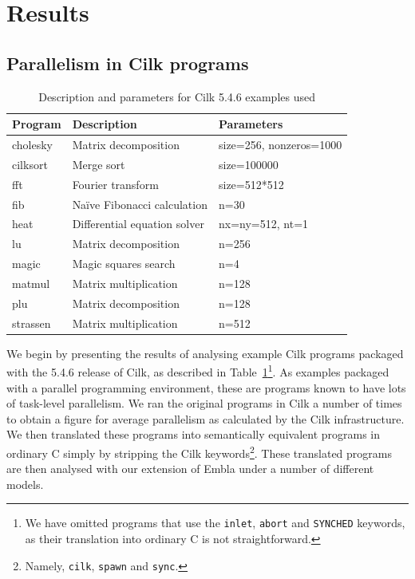 \section{Results} \label{sresults}

\subsection{Parallelism in Cilk programs}

\begin{table}
\small
\begin{tabular}{ | l | l | l | }
\hline
Program & Description & Parameters \\
\hline
cholesky & Matrix decomposition & size=256, nonzeros=1000 \\
cilksort & Merge sort & size=100000 \\
fft & Fourier transform & size=512*512 \\
fib & Na\"ive Fibonacci calculation & n=30 \\
heat & Differential equation solver & nx=ny=512, nt=1 \\ 
lu & Matrix decomposition & n=256 \\
magic & Magic squares search & n=4 \\
matmul & Matrix multiplication & n=128 \\
plu & Matrix decomposition & n=128 \\
strassen & Matrix multiplication & n=512 \\
\hline
\end{tabular}
\caption{Description and parameters for Cilk 5.4.6 examples used}
\label{cilk-ex}
\end{table}

We begin by presenting the results of analysing example Cilk programs packaged with the 5.4.6 release of Cilk, as described in Table~\ref{cilk-ex}\footnote{We have omitted programs that use the \texttt{inlet}, \texttt{abort} and \texttt{SYNCHED} keywords, as their translation into ordinary C is not straightforward.}.
As examples packaged with a parallel programming environment, these are programs known to have lots of task-level parallelism.
We ran the original programs in Cilk a number of times to obtain a figure for average parallelism as calculated by the Cilk infrastructure.
We then translated these programs into semantically equivalent programs in ordinary C simply by stripping the Cilk keywords\footnote{Namely, \texttt{cilk}, \texttt{spawn} and \texttt{sync}.}.
These translated programs are then analysed with our extension of Embla under a number of different models.

